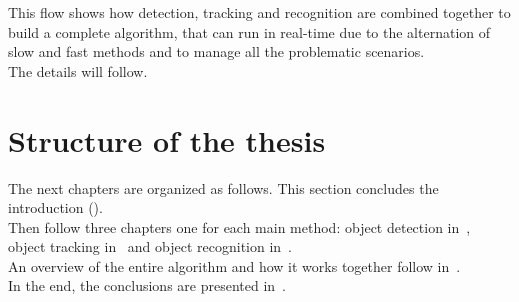 This flow shows how detection, tracking and recognition are combined together to build a complete algorithm, that can run in real-time due to the alternation of slow and fast methods and to manage all the problematic scenarios.\\
The details will follow.

\section{Structure of the thesis}
The next chapters are organized as follows. This section concludes the introduction ().\\
Then follow three chapters one for each main method: object detection in~, object tracking in~ and object recognition in~.\\
An overview of the entire algorithm and how it works together follow  in~.\\
In the end, the conclusions are presented in~.





